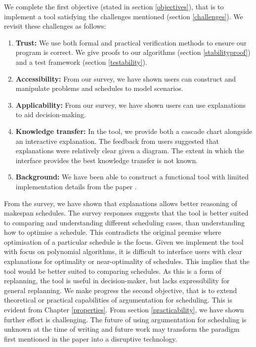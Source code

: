 We complete the first objective (stated in section \ref{objectives}), that is to implement a tool satisfying the challenges mentioned (section \ref{challenges}). We revisit these challenges as follows:
\begin{enumerate}
	\item\textbf{Trust:} We use both formal and practical verification methods to ensure our program is correct. We give proofs to our algorithms (section \ref{stabilityproof}) and a test framework (section \ref{testability}).
	\item\textbf{Accessibility:} From our survey, we have shown users can construct and manipulate problems and schedules to model scenarios.
	\item\textbf{Applicability:} From our survey, we have shown users can use explanations to aid decision-making.
	\item\textbf{Knowledge transfer:} In the tool, we provide both a cascade chart alongside an interactive explanation. The feedback from users suggested that explanations were relatively clear given a diagram. The extent in which the interface provides the best knowledge transfer is not known.
	\item\textbf{Background:} We have been able to construct a functional tool with limited implementation details from the paper \cite{aes}.
\end{enumerate}

From the survey, we have shown that explanations allows better reasoning of makespan schedules. The survey responses suggests that the tool is better suited to comparing and understanding different scheduling cases, than understanding how to optimise a schedule. This contradicts the original premise where optimisation of a particular schedule is the focus. Given we implement the tool with focus on polynomial algorithms, it is difficult to interface users with clear explanations for optimality or near-optimality of schedules. This implies that the tool would be better suited to comparing schedules. As this is a form of replanning, the tool is useful in decision-maker, but lacks expressibility for general replanning.
\linespace
We make progress the second objective, that is to extend theoretical or practical capabilities of argumentation for scheduling. This is evident from Chapter \ref{properties}. From section \ref{practicability}, we have shown further effort is challenging. The future of using argumentation for scheduling is unknown at the time of writing and future work may transform the paradigm first mentioned in the paper \cite{aes} into a disruptive technology.


